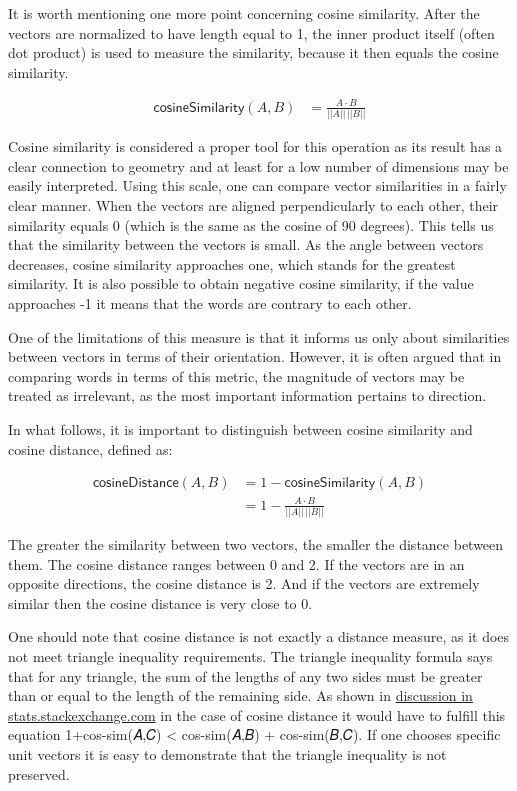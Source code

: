 \documentclass[12pt,]{book}
\begin{document}
It is worth mentioning one more point concerning cosine similarity.
After the vectors are normalized to have length equal to 1, the inner
product itself (often dot product) is used to measure the similarity,
because it then equals the cosine similarity.

\begin{align} \tag{Sim}
\mathsf{cosineSimilarity}(A,B) & = \frac{A \cdot B}{\vert \vert A \vert \vert \,\vert \vert B \vert \vert}
\end{align}

Cosine similarity is considered a proper tool for this operation as its
result has a clear connection to geometry and at least for a low number
of dimensions may be easily interpreted. Using this scale, one can
compare vector similarities in a fairly clear manner. When the vectors
are aligned perpendicularly to each other, their similarity equals 0
(which is the same as the cosine of 90 degrees). This tells us that the
similarity between the vectors is small. As the angle between vectors
decreases, cosine similarity approaches one, which stands for the
greatest similarity. It is also possible to obtain negative cosine
similarity, if the value approaches -1 it means that the words are
contrary to each other.

One of the limitations of this measure is that it informs us only about
similarities between vectors in terms of their orientation. However, it
is often argued that in comparing words in terms of this metric, the
magnitude of vectors may be treated as irrelevant, as the most important
information pertains to direction.

In what follows, it is important to distinguish between cosine
similarity and cosine distance, defined as:

\begin{align} \tag{Sim}
\mathsf{cosineDistance}(A,B) &  = 1 - \mathsf{cosineSimilarity}(A,B)\\
 &  = 1 - \frac{A \cdot B}{\vert \vert A \vert \vert \,\vert \vert B \vert \vert} \nonumber
\end{align}

The greater the similarity between two vectors, the smaller the distance
between them. The cosine distance ranges between 0 and 2. If the vectors
are in an opposite directions, the cosine distance is 2. And if the
vectors are extremely similar then the cosine distance is very close to
0.

One should note that cosine distance is not exactly a distance measure,
as it does not meet triangle inequality requirements. The triangle
inequality formula says that for any triangle, the sum of the lengths of
any two sides must be greater than or equal to the length of the
remaining side. As shown in
\href{https://stats.stackexchange.com/questions/198080/proving-that-cosine-distance-function-defined-by-cosine-similarity-between-two-u}{discussion
in stats.stackexchange.com} in the case of cosine distance it would have
to fulfill this equation 1+cos-sim(𝐴,𝐶) \textless{} cos-sim(𝐴,𝐵) +
cos-sim(𝐵,𝐶). If one chooses specific unit vectors it is easy to
demonstrate that the triangle inequality is not preserved.
\end{document}

